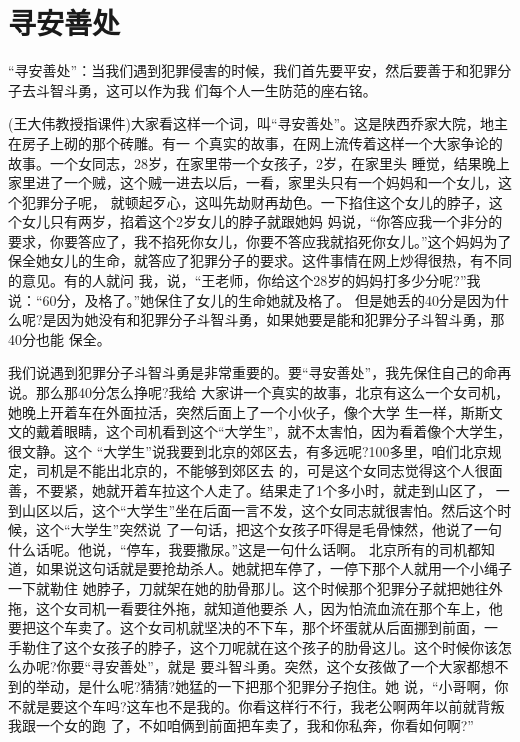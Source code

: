 \documentclass[11pt,a4paper,onecolumn]{article}
\begin{document}
\section{寻安善处}

``寻安善处''：当我们遇到犯罪侵害的时候，我们首先要平安，然后要善于和犯罪分子去斗智斗勇，这可以作为我
们每个人一生防范的座右铭。

(王大伟教授指课件)大家看这样一个词，叫``寻安善处''。这是陕西乔家大院，地主在房子上砌的那个砖雕。有一
个真实的故事，在网上流传着这样一个大家争论的故事。一个女同志，28岁，在家里带一个女孩子，2岁，在家里头
睡觉，结果晚上家里进了一个贼，这个贼一进去以后，一看，家里头只有一个妈妈和一个女儿，这个犯罪分子呢，
就顿起歹心，这叫先劫财再劫色。一下掐住这个女儿的脖子，这个女儿只有两岁，掐着这个2岁女儿的脖子就跟她妈
妈说，``你答应我一个非分的要求，你要答应了，我不掐死你女儿，你要不答应我就掐死你女儿。''这个妈妈为了
保全她女儿的生命，就答应了犯罪分子的要求。这件事情在网上炒得很热，有不同的意见。有的人就问
我，说，``王老师，你给这个28岁的妈妈打多少分呢?''我说：``60分，及格了。''她保住了女儿的生命她就及格了。
但是她丢的40分是因为什么呢?是因为她没有和犯罪分子斗智斗勇，如果她要是能和犯罪分子斗智斗勇，那40分也能
保全。

我们说遇到犯罪分子斗智斗勇是非常重要的。要``寻安善处''，我先保住自己的命再说。那么那40分怎么挣呢?我给
大家讲一个真实的故事，北京有这么一个女司机，她晚上开着车在外面拉活，突然后面上了一个小伙子，像个大学
生一样，斯斯文文的戴着眼睛，这个司机看到这个``大学生''，就不太害怕，因为看着像个大学生，很文静。这个
``大学生''说我要到北京的郊区去，有多远呢?100多里，咱们北京规定，司机是不能出北京的，不能够到郊区去
的，可是这个女同志觉得这个人很面善，不要紧，她就开着车拉这个人走了。结果走了1个多小时，就走到山区了，
一到山区以后，这个``大学生''坐在后面一言不发，这个女同志就很害怕。然后这个时候，这个``大学生''突然说
了一句话，把这个女孩子吓得是毛骨悚然，他说了一句什么话呢。他说，``停车，我要撒尿。''这是一句什么话啊。
北京所有的司机都知道，如果说这句话就是要抢劫杀人。她就把车停了，一停下那个人就用一个小绳子一下就勒住
她脖子，刀就架在她的肋骨那儿。这个时候那个犯罪分子就把她往外拖，这个女司机一看要往外拖，就知道他要杀
人，因为怕流血流在那个车上，他要把这个车卖了。这个女司机就坚决的不下车，那个坏蛋就从后面挪到前面，一
手勒住了这个女孩子的脖子，这个刀呢就在这个孩子的肋骨这儿。这个时候你该怎么办呢?你要``寻安善处''，就是
要斗智斗勇。突然，这个女孩做了一个大家都想不到的举动，是什么呢?猜猜?她猛的一下把那个犯罪分子抱住。她
说，``小哥啊，你不就是要这个车吗?这车也不是我的。你看这样行不行，我老公啊两年以前就背叛我跟一个女的跑
了，不如咱俩到前面把车卖了，我和你私奔，你看如何啊?''
\end{document}
